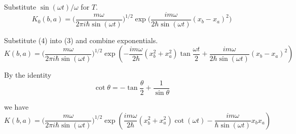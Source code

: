 Substitute $\sin(\omega t)/\omega$ for $T$.
\begin{equation*}
K_0(b,a)=\biggl(\frac{m\omega}{2\pi i\hbar\sin(\omega t)}\biggr)^{1/2}
\exp\biggl(\frac{im\omega}{2\hbar\sin(\omega t)}(x_b-x_a)^2\biggr)
\tag{4}
\end{equation*}

Substitute (4) into (3) and combine exponentials.
$$
K(b,a)=\biggl(\frac{m\omega}{2\pi i\hbar\sin(\omega t)}\biggr)^{1/2}
\exp\left(-\frac{im\omega}{2\hbar}\left(x_b^2+x_a^2\right)\tan\frac{\omega t}{2}
+\frac{im\omega}{2\hbar\sin(\omega t)}(x_b-x_a)^2\right)
$$

By the identity
$$
\cot\theta=-\tan\frac{\theta}{2}+\frac{1}{\sin\theta}
$$

we have
$$
K(b,a)=\biggl(\frac{m\omega}{2\pi i\hbar\sin(\omega t)}\biggr)^{1/2}
\exp\left(\frac{im\omega}{2\hbar}\left(x_b^2+x_a^2\right)\cot(\omega t)
-\frac{im\omega}{\hbar\sin(\omega t)}x_bx_a\right)
$$


